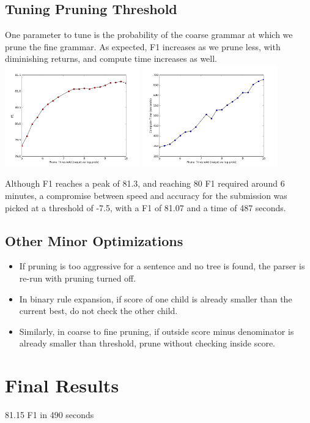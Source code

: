 \documentclass[11pt]{article}
\begin{document}
\subsection{Tuning Pruning Threshold}
One parameter to tune is the probability of the coarse grammar at which
we prune the fine grammar. As expected, F1 increases as we prune less, with 
diminishing returns, and compute time increases as well.
\includegraphics[keepaspectratio=true, width=220px]{thresh_f1.png}
\includegraphics[keepaspectratio=true, width=220px]{thresh_time.png}

Although F1 reaches a peak of 81.3, and reaching 80 F1 required around 6 minutes, 
a compromise between speed and accuracy for the submission was
picked at a threshold of -7.5, with a F1 of 81.07 and a time of 487 seconds. 

\subsection{Other Minor Optimizations}
\begin{itemize}
\item If pruning is too aggressive for a sentence and no tree is found,
the parser is re-run with pruning turned off.
\item In binary rule expansion, if score of one child is already smaller than the current best,
do not check the other child.
\item Similarly, in coarse to fine pruning, if outside score minus denominator is already smaller
than threshold, prune without checking inside score.
\end{itemize}

\section{Final Results}
81.15 F1 in 490 seconds
\end{document}
